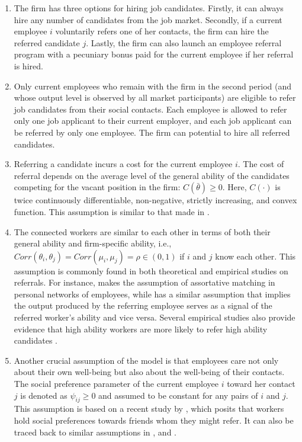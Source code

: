 \documentclass[12pt]{article}
\begin{document}
\begin{enumerate}[label={A}{\arabic*}., resume]
    \item The firm has three options for hiring job candidates. Firstly, it can always hire any number of candidates from the job market. Secondly, if a current employee $i$ voluntarily refers one of her contacts, the firm can hire the referred candidate $j$. Lastly, the firm can also launch an employee referral program with a pecuniary bonus paid for the current employee if her referral is hired.
    \item Only current employees who remain with the firm in the second period (and whose output level is observed by all market participants) are eligible to refer job candidates from their social contacts. Each employee is allowed to refer only one job applicant to their current employer, and each job applicant can be referred by only one employee. The firm can potential to hire all referred candidates.
    \item Referring a candidate incurs a cost for the current employee $i$. The cost of referral depends on the average level of the general ability of the candidates competing for the vacant position in the firm: $C(\bar{\theta}) \geq 0$. Here, $C(\cdot)$ is twice continuously differentiable, non-negative, strictly increasing, and convex function. This assumption is similar to that made in \cite{ekinci2016employee}.
    \item The connected workers are similar to each other in terms of both their general ability and firm-specific ability, i.e., $Corr(\theta_{i},\theta_{j}) = Corr(\mu_{i},\mu_{j})= \rho \in (0,1)$ if $i$ and $j$ know each other. This assumption is commonly found in both theoretical and empirical studies on referrals. For instance, \cite{montgomery1991social} makes the assumption of assortative matching in personal networks of employees, while \cite{ekinci2016employee} has a similar assumption that implies the output produced by the referring employee serves as a signal of the referred worker’s ability and vice versa. Several empirical studies also provide evidence that high ability workers are more likely to refer high ability candidates \citep{beaman2012gets, burks2015value, lalanne2021social}.
    \item Another crucial assumption of the model is that employees care not only about their own well-being but also about the well-being of their contacts. The social preference parameter of the current employee $i$ toward her contact $j$ is denoted as $\psi_{ij} \geq 0$ and assumed to be constant for any pairs of $i$ and $j$. This assumption is based on a recent study by \cite{friebel2023employee}, which posits that workers hold social preferences towards friends whom they might refer. It can also be traced back to similar assumptions in \cite{bandiera2005social}, \cite{bandiera2009social} and \cite{beaman2012gets}.
\end{enumerate}
\end{document}
